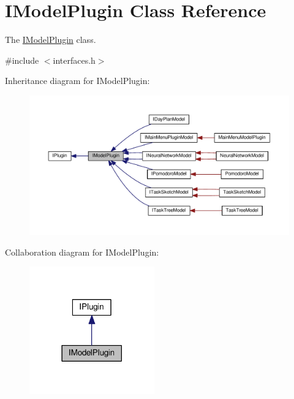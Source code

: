 \hypertarget{class_i_model_plugin}{}\section{I\+Model\+Plugin Class Reference}
\label{class_i_model_plugin}


The \hyperlink{class_i_model_plugin}{I\+Model\+Plugin} class.  




{\ttfamily \#include $<$interfaces.\+h$>$}



Inheritance diagram for I\+Model\+Plugin\+:\nopagebreak
\begin{figure}[H]
\begin{center}
\leavevmode
\includegraphics[width=350pt]{class_i_model_plugin__inherit__graph}
\end{center}
\end{figure}


Collaboration diagram for I\+Model\+Plugin\+:\nopagebreak
\begin{figure}[H]
\begin{center}
\leavevmode
\includegraphics[width=153pt]{class_i_model_plugin__coll__graph}
\end{center}
\end{figure}

